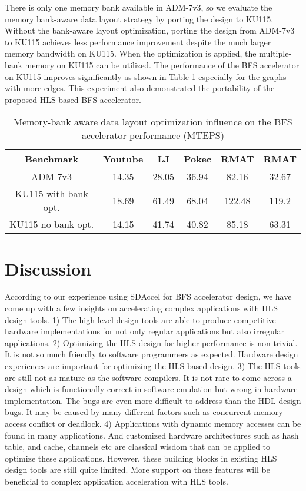 There is only one memory bank available in ADM-7v3, so we 
evaluate the memory bank-aware data layout strategy by porting the design to KU115.
Without the bank-aware layout optimization, porting the design from ADM-7v3 to 
KU115 achieves less performance improvement despite the much larger memory 
bandwidth on KU115. When the optimization is applied, the multiple-bank memory 
on KU115 can be utilized. The performance of the BFS accelerator on KU115 improves 
significantly as shown in Table \ref{tab:porting-summary} especially for the 
graphs with more edges. This experiment also 
demonstrated the portability of the proposed HLS based BFS accelerator.
\begin{table}
	\vspace{-0.5em}
    \centering
	\caption{Memory-bank aware data layout optimization influence on the BFS accelerator performance (MTEPS)}
  \label{tab:porting-summary}
  \vspace{-0.3em}
  \begin{tabular}{cccccc}
    \toprule
	Benchmark & Youtube & LJ & Pokec & RMAT\uppercase\expandafter{\romannumeral1} & RMAT\uppercase\expandafter{\romannumeral2} \\
    \midrule
	ADM-7v3 & 14.35 & 28.05 & 36.94 & 82.16 & 32.67 \\
	KU115 with bank opt. & 18.69 & 61.49 & 68.04 & 122.48 & 119.2 \\
	KU115 no bank opt. & 14.15 & 41.74 & 40.82 & 85.18 & 63.31\\
  \bottomrule
\end{tabular}
\vspace{-1em}
\end{table}

\section{Discussion}
According to our experience using SDAccel for BFS accelerator design, 
we have come up with a few insights on accelerating complex applications 
with HLS design tools. 1) The high level design tools are able to produce competitive 
hardware implementations for not only regular applications but 
also irregular applications. 2) Optimizing the HLS design for higher performance is non-trivial. It is not 
so much friendly to software programmers as expected. Hardware design 
experiences are important for optimizing the HLS based design. 
3) The HLS tools are still not as mature as the software compilers. 
It is not rare to come across a design which is functionally correct 
in software emulation but wrong in hardware implementation. The bugs are 
even more difficult to address than the HDL design bugs. It may be caused by 
many different factors such as concurrent memory access conflict or deadlock. 
4) Applications with dynamic memory accesses can be found in many applications. 
And customized hardware architectures such as hash table, and cache, channels etc are 
classical wisdom that can be applied to optimize these applications. However, 
these building blocks in existing HLS design tools are still quite limited. More 
support on these features will be beneficial to complex application 
acceleration with HLS tools.

